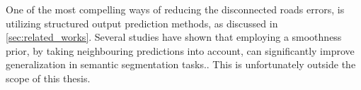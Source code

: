 One of the most compelling ways of reducing the disconnected roads errors, is utilizing structured output prediction methods, as discussed in \ref{sec:related_works}. Several studies \citep{Kluckner_semantic_height} \citep{LeCun_semantic} \citep{Mnih_roads_high_res_aerial_images} have shown that employing a smoothness prior, by taking neighbouring predictions into account, can significantly improve generalization in semantic segmentation tasks.. This is unfortunately outside the scope of this thesis.\\



